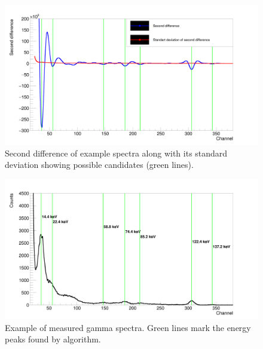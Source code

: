 \begin{figure}[H]
 \centering
 \includegraphics[scale=0.105, angle = 0]{./pictures/SecondDerivGraph.png}
 \caption{Second difference of example spectra along with its standard deviation showing possible candidates (green lines).}
 \label{secondDerivative}
 
\end{figure}

\begin{figure}[H]
 \centering
 \includegraphics[scale=0.105, angle = 0]{./pictures/DataGraph.png}
 \caption{Example of measured gamma spectra. Green lines mark the energy peaks found by algorithm.}
 \label{Example}
 
\end{figure}
